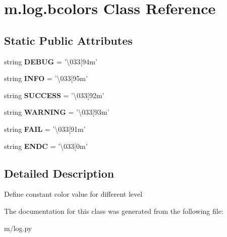 \hypertarget{classm_1_1log_1_1bcolors}{\section{m.\-log.\-bcolors Class Reference}
\label{classm_1_1log_1_1bcolors}
}
\subsection*{Static Public Attributes}
\begin{DoxyCompactItemize}
\item 
\hypertarget{classm_1_1log_1_1bcolors_a930ec546f4b168584a472688b7f76159}{string {\bfseries D\-E\-B\-U\-G} = '\textbackslash{}033\mbox{[}94m'}\label{classm_1_1log_1_1bcolors_a930ec546f4b168584a472688b7f76159}

\item 
\hypertarget{classm_1_1log_1_1bcolors_ac1f6785cf1156a6e807bd34becae40cc}{string {\bfseries I\-N\-F\-O} = '\textbackslash{}033\mbox{[}95m'}\label{classm_1_1log_1_1bcolors_ac1f6785cf1156a6e807bd34becae40cc}

\item 
\hypertarget{classm_1_1log_1_1bcolors_a08e96f78e19ddcbeb35803253921a8d6}{string {\bfseries S\-U\-C\-C\-E\-S\-S} = '\textbackslash{}033\mbox{[}92m'}\label{classm_1_1log_1_1bcolors_a08e96f78e19ddcbeb35803253921a8d6}

\item 
\hypertarget{classm_1_1log_1_1bcolors_adf7b4f5d7944a6513fc8c41d6a5dc14b}{string {\bfseries W\-A\-R\-N\-I\-N\-G} = '\textbackslash{}033\mbox{[}93m'}\label{classm_1_1log_1_1bcolors_adf7b4f5d7944a6513fc8c41d6a5dc14b}

\item 
\hypertarget{classm_1_1log_1_1bcolors_aefe04c066409cd17944030d7c8f7da78}{string {\bfseries F\-A\-I\-L} = '\textbackslash{}033\mbox{[}91m'}\label{classm_1_1log_1_1bcolors_aefe04c066409cd17944030d7c8f7da78}

\item 
\hypertarget{classm_1_1log_1_1bcolors_a2ca52c51d05abcaa81c0c4703741cd0c}{string {\bfseries E\-N\-D\-C} = '\textbackslash{}033\mbox{[}0m'}\label{classm_1_1log_1_1bcolors_a2ca52c51d05abcaa81c0c4703741cd0c}

\end{DoxyCompactItemize}


\subsection{Detailed Description}
\begin{DoxyVerb}Define constant color value for different level
\end{DoxyVerb}
 

The documentation for this class was generated from the following file\-:\begin{DoxyCompactItemize}
\item 
m/log.\-py\end{DoxyCompactItemize}
